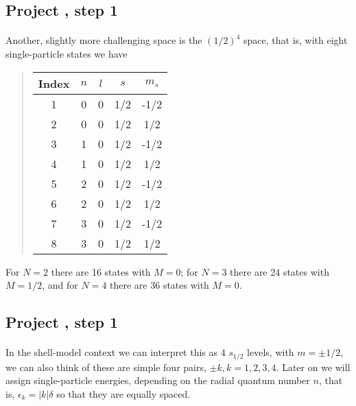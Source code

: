 \documentclass[%
twoside,                 %
final,                   %
10pt]{article}
\begin{document}
\subsection*{Project , step 1}

\paragraph{}
Another, slightly more challenging space is the $(1/2)^4$ space, that is, 
with eight  single-particle states we have


\begin{quote}
\begin{tabular}{ccccc}
\hline
\multicolumn{1}{c}{ Index } & \multicolumn{1}{c}{ $n$ } & \multicolumn{1}{c}{ $l$ } & \multicolumn{1}{c}{ $s$ } & \multicolumn{1}{c}{ $m_s$ } \\
\hline
1     & 0   & 0   & 1/2 & -1/2  \\
2     & 0   & 0   & 1/2 & 1/2   \\
3     & 1   & 0   & 1/2 & -1/2  \\
4     & 1   & 0   & 1/2 & 1/2   \\
5     & 2   & 0   & 1/2 & -1/2  \\
6     & 2   & 0   & 1/2 & 1/2   \\
7     & 3   & 0   & 1/2 & -1/2  \\
8     & 3   & 0   & 1/2 & 1/2   \\
\hline
\end{tabular}
\end{quote}

\noindent
For $N=2$ there are 16 states with $M=0$; for $N=3$ there are 24 states with $M=1/2$, and for 
$N=4$ there are 36 states with $M=0$.



\subsection*{Project , step 1}

\paragraph{}
In the shell-model context we can interpret this as 4 $s_{1/2}$ levels, with $m = \pm 1/2$, we can also think of these are simple four pairs,  $\pm k, k = 1,2,3,4$. Later on we will 
assign single-particle energies,  depending on the radial quantum number $n$, that is, 
$\epsilon_k = |k| \delta$ so that they are equally spaced.
\end{document}
